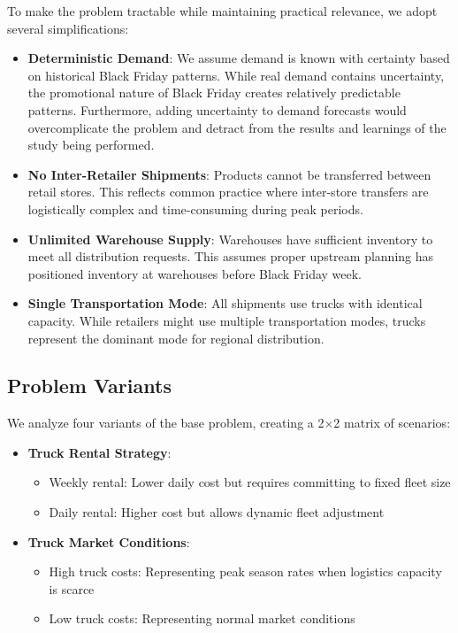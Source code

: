 \documentclass[a4paper,12pt]{article}
\begin{document}
To make the problem tractable while maintaining practical relevance, we adopt several simplifications:

\begin{itemize}
    \item \textbf{Deterministic Demand}: We assume demand is known with certainty based on historical Black Friday patterns.
While real demand contains uncertainty, the promotional nature of Black Friday creates relatively predictable patterns.
Furthermore, adding uncertainty to demand forecasts would overcomplicate the problem and detract from the results and learnings of the study being performed.

    \item \textbf{No Inter-Retailer Shipments}: Products cannot be transferred between retail stores.
This reflects common practice where inter-store transfers are logistically complex and time-consuming during peak periods.

    \item \textbf{Unlimited Warehouse Supply}: Warehouses have sufficient inventory to meet all distribution requests.
This assumes proper upstream planning has positioned inventory at warehouses before Black Friday week.

    \item \textbf{Single Transportation Mode}: All shipments use trucks with identical capacity.
While retailers might use multiple transportation modes, trucks represent the dominant mode for regional distribution.
\end{itemize}


\subsection{Problem Variants}\label{subsec:problem-variants}

We analyze four variants of the base problem, creating a 2×2 matrix of scenarios:

\begin{itemize}
    \item \textbf{Truck Rental Strategy}:
    \begin{itemize}
        \item Weekly rental: Lower daily cost but requires committing to fixed fleet size
        \item Daily rental: Higher cost but allows dynamic fleet adjustment
    \end{itemize}

    \item \textbf{Truck Market Conditions}:
    \begin{itemize}
        \item High truck costs: Representing peak season rates when logistics capacity is scarce
        \item Low truck costs: Representing normal market conditions
    \end{itemize}
\end{itemize}
\end{document}
